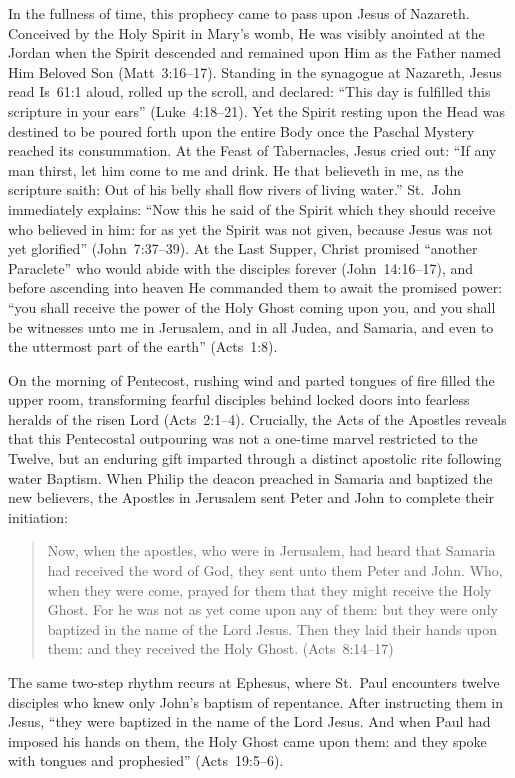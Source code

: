 In the fullness of time, this prophecy came to pass upon Jesus of Nazareth. Conceived by the Holy Spirit in Mary's womb, He was visibly anointed at the Jordan when the Spirit descended and remained upon Him as the Father named Him Beloved Son (Matt~3:16--17). Standing in the synagogue at Nazareth, Jesus read Is~61:1 aloud, rolled up the scroll, and declared: ``This day is fulfilled this scripture in your ears'' (Luke~4:18--21). Yet the Spirit resting upon the Head was destined to be poured forth upon the entire Body once the Paschal Mystery reached its consummation. At the Feast of Tabernacles, Jesus cried out: ``If any man thirst, let him come to me and drink. He that believeth in me, as the scripture saith: Out of his belly shall flow rivers of living water.'' St.~John immediately explains: ``Now this he said of the Spirit which they should receive who believed in him: for as yet the Spirit was not given, because Jesus was not yet glorified'' (John~7:37--39). At the Last Supper, Christ promised ``another Paraclete'' who would abide with the disciples forever (John~14:16--17), and before ascending into heaven He commanded them to await the promised power: ``you shall receive the power of the Holy Ghost coming upon you, and you shall be witnesses unto me in Jerusalem, and in all Judea, and Samaria, and even to the uttermost part of the earth'' (Acts~1:8).

On the morning of Pentecost, rushing wind and parted tongues of fire filled the upper room, transforming fearful disciples behind locked doors into fearless heralds of the risen Lord (Acts~2:1--4). Crucially, the Acts of the Apostles reveals that this Pentecostal outpouring was not a one-time marvel restricted to the Twelve, but an enduring gift imparted through a distinct apostolic rite following water Baptism. When Philip the deacon preached in Samaria and baptized the new believers, the Apostles in Jerusalem sent Peter and John to complete their initiation:
\begin{quotation}
Now, when the apostles, who were in Jerusalem, had heard that Samaria had received the word of God, they sent unto them Peter and John. Who, when they were come, prayed for them that they might receive the Holy Ghost. For he was not as yet come upon any of them: but they were only baptized in the name of the Lord Jesus. Then they laid their hands upon them: and they received the Holy Ghost. (Acts~8:14--17)
\end{quotation}
The same two-step rhythm recurs at Ephesus, where St.~Paul encounters twelve disciples who knew only John's baptism of repentance. After instructing them in Jesus, ``they were baptized in the name of the Lord Jesus. And when Paul had imposed his hands on them, the Holy Ghost came upon them: and they spoke with tongues and prophesied'' (Acts~19:5--6).

